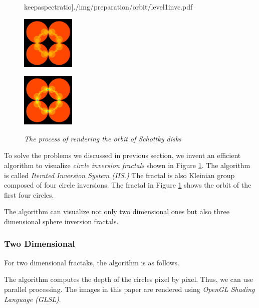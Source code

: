 \begin{figure}[htbp]
\begin{minipage}[t]{0.16\hsize}
  keepaspectratio]{./img/preparation/orbit/level1invc.pdf}
  \subcaption{}
  \label{fig:level1inv}
 \end{minipage}
 \begin{minipage}[t]{0.16\hsize}
  \center
  \includegraphics[width=1in, height=1in, keepaspectratio]{./img/preparation/orbit/level2c.pdf}
  \subcaption{}
  \label{fig:level2}
 \end{minipage}
 \begin{minipage}[t]{0.16\hsize}
  \center
  \includegraphics[width=1in, height=1in, keepaspectratio]{img/preparation/orbit/levelMaxc.pdf}
  \subcaption{}
  \label{fig:levelMax}
 \end{minipage}
 \caption{\textit{The process of rendering the orbit of Schottky disks}}
\end{figure}

To solve the problems we discussed in previous section,
we invent an efficient algorithm to visualize \textit{circle inversion
fractals} shown in Figure \ref{fig:levelMax}. 
The algorithm is called \textit{Iterated Inversion System (IIS.)}
The fractal is also Kleinian group composed of four circle inversions.
The fractal in Figure \ref{fig:levelMax} shows the orbit of the first
four circles.

The algorithm can visualize not only two dimensional ones but
also three dimensional sphere inversion fractals.

\subsubsection{Two Dimensional}

For two dimensional fractaks, the algorithm is as follows. 

The algorithm computes the depth of the circles pixel by pixel.
Thus, we can use parallel processing.
The images in this paper are rendered using \textit{OpenGL Shading
Language (GLSL)}.

